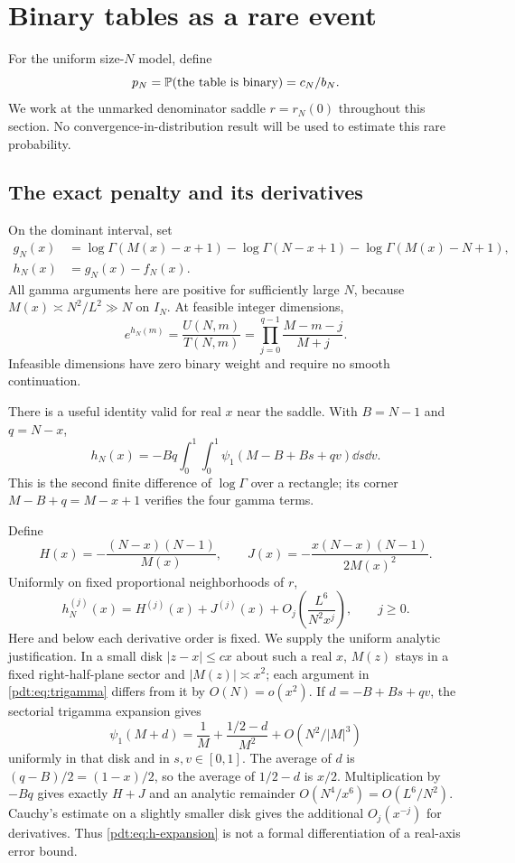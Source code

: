 \section{Binary tables as a rare event}
\label{pdt:sec:binary}
For the uniform size-$N$ model, define
\[
 p_N=\mathbb P(\text{the table is binary})=c_N/b_N.
\]
We work at the unmarked denominator saddle $r=r_N(0)$ throughout this section. No convergence-in-distribution result will be used to estimate this rare probability.

\subsection{The exact penalty and its derivatives}
On the dominant interval, set
\begin{align}
 g_N(x)&=\log\Gamma(M(x)-x+1)-\log\Gamma(N-x+1)
          -\log\Gamma(M(x)-N+1),\label{pdt:eq:gphase}\\
 h_N(x)&=g_N(x)-f_N(x).\label{pdt:eq:hphase}
\end{align}
All gamma arguments here are positive for sufficiently large $N$, because $M(x)\asymp N^2/L^2\gg N$ on $I_N$. At feasible integer dimensions,
\begin{equation}\label{pdt:eq:binary-product}
 e^{h_N(m)}=\frac{U(N,m)}{T(N,m)}
          =\prod_{j=0}^{q-1}\frac{M-m-j}{M+j}.
\end{equation}
Infeasible dimensions have zero binary weight and require no smooth continuation.

There is a useful identity valid for real $x$ near the saddle. With $B=N-1$ and $q=N-x$,
\begin{equation}\label{pdt:eq:trigamma}
 h_N(x)=-Bq\int_0^1\int_0^1
       \psi_1(M-B+Bs+qv)\dd s\dd v.
\end{equation}
This is the second finite difference of $\log\Gamma$ over a rectangle; its corner $M-B+q=M-x+1$ verifies the four gamma terms.

Define
\begin{equation}\label{pdt:eq:penalties}
 H(x)=-\frac{(N-x)(N-1)}{M(x)},\qquad
 J(x)=-\frac{x(N-x)(N-1)}{2M(x)^2}.
\end{equation}
Uniformly on fixed proportional neighborhoods of $r$,
\begin{equation}\label{pdt:eq:h-expansion}
 h_N^{(j)}(x)=H^{(j)}(x)+J^{(j)}(x)
      +O_j\!\left(\frac{L^6}{N^2x^j}\right),\qquad j\ge0.
\end{equation}
Here and below each derivative order is fixed. We supply the uniform analytic justification. In a small disk $|z-x|\le cx$ about such a real $x$, $M(z)$ stays in a fixed right-half-plane sector and $|M(z)|\asymp x^2$; each argument in \eqref{pdt:eq:trigamma} differs from it by $O(N)=o(x^2)$. If $d=-B+Bs+qv$, the sectorial trigamma expansion gives
\[
 \psi_1(M+d)=\frac1M+\frac{1/2-d}{M^2}+O(N^2/|M|^3)
\]
uniformly in that disk and in $s,v\in[0,1]$. The average of $d$ is $(q-B)/2=(1-x)/2$, so the average of $1/2-d$ is $x/2$. Multiplication by $-Bq$ gives exactly $H+J$ and an analytic remainder $O(N^4/x^6)=O(L^6/N^2)$. Cauchy's estimate on a slightly smaller disk gives the additional $O_j(x^{-j})$ for derivatives. Thus \eqref{pdt:eq:h-expansion} is not a formal differentiation of a real-axis error bound.

